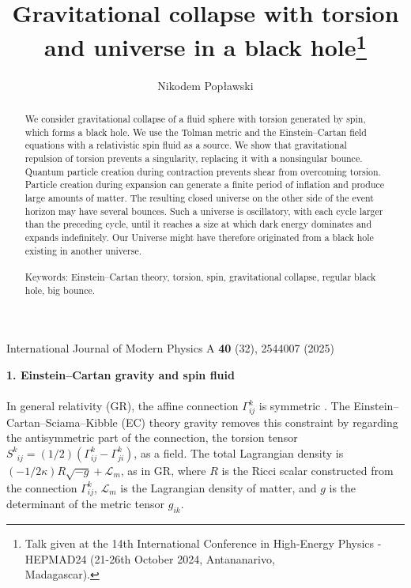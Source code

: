 \documentclass[prd,onecolumn,nofootinbib]{revtex4}
\begin{document}
\noindent
International Journal of Modern Physics A {\bf 40} (32), 2544007 (2025)\\

\title{Gravitational collapse with torsion and universe in a black hole\footnote{Talk given at the 14th International Conference in High-Energy Physics  - HEPMAD24 (21-26th October 2024, Antananarivo,\\Madagascar).}}
\author{Nikodem Pop{\l}awski}


\begin{abstract}
We consider gravitational collapse of a fluid sphere with torsion generated by spin, which forms a black hole.
We use the Tolman metric and the Einstein--Cartan field equations with a relativistic spin fluid as a source.
We show that gravitational repulsion of torsion prevents a singularity, replacing it with a nonsingular bounce.
Quantum particle creation during contraction prevents shear from overcoming torsion.
Particle creation during expansion can generate a finite period of inflation and produce large amounts of matter.
The resulting closed universe on the other side of the event horizon may have several bounces.
Such a universe is oscillatory, with each cycle larger than the preceding cycle, until it reaches a size at which dark energy dominates and expands indefinitely.
Our Universe might have therefore originated from a black hole existing in another universe.\\ \\
Keywords: Einstein--Cartan theory, torsion, spin, gravitational collapse, regular black hole, big bounce.
\end{abstract}
\maketitle


{\bf 1. Einstein--Cartan gravity and spin fluid}\\ \\
In general relativity (GR), the affine connection $\Gamma^{k}_{ij}$ is symmetric \cite{Schr}.
The Einstein--Cartan--Sciama--Kibble (EC) theory gravity removes this constraint by regarding the antisymmetric part of the connection, the torsion tensor $S^k_{\phantom{k}ij}=(1/2)(\Gamma^{k}_{ij}-\Gamma^{k}_{ji})$, as a field.
The total Lagrangian density is $(-1/2\kappa)R\sqrt{-g}+\mathcal{L}_m$, as in GR, where $R$ is the Ricci scalar constructed from the connection $\Gamma^{k}_{ij}$, $\mathcal{L}_m$ is the Lagrangian density of matter, and $g$ is the determinant of the metric tensor $g_{ik}$.
\end{document}
